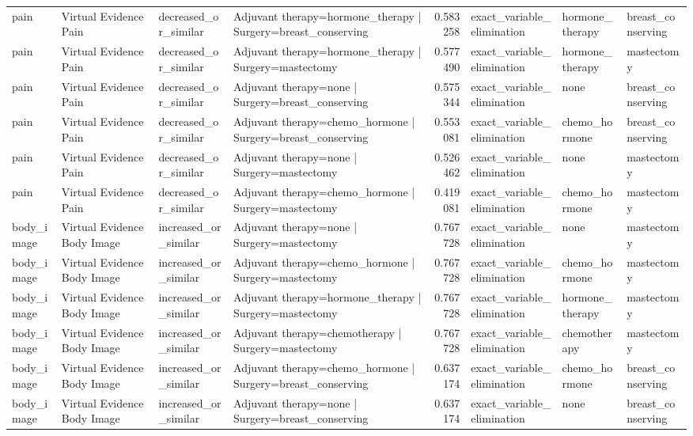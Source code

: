 \begin{table}
\begin{tabular}{llllrlll}
pain & Virtual Evidence Pain & decreased\_or\_similar & Adjuvant therapy=hormone\_therapy | Surgery=breast\_conserving & 0.583258 & exact\_variable\_elimination & hormone\_therapy & breast\_conserving \\
pain & Virtual Evidence Pain & decreased\_or\_similar & Adjuvant therapy=hormone\_therapy | Surgery=mastectomy & 0.577490 & exact\_variable\_elimination & hormone\_therapy & mastectomy \\
pain & Virtual Evidence Pain & decreased\_or\_similar & Adjuvant therapy=none | Surgery=breast\_conserving & 0.575344 & exact\_variable\_elimination & none & breast\_conserving \\
pain & Virtual Evidence Pain & decreased\_or\_similar & Adjuvant therapy=chemo\_hormone | Surgery=breast\_conserving & 0.553081 & exact\_variable\_elimination & chemo\_hormone & breast\_conserving \\
pain & Virtual Evidence Pain & decreased\_or\_similar & Adjuvant therapy=none | Surgery=mastectomy & 0.526462 & exact\_variable\_elimination & none & mastectomy \\
pain & Virtual Evidence Pain & decreased\_or\_similar & Adjuvant therapy=chemo\_hormone | Surgery=mastectomy & 0.419081 & exact\_variable\_elimination & chemo\_hormone & mastectomy \\
body\_image & Virtual Evidence Body Image & increased\_or\_similar & Adjuvant therapy=none | Surgery=mastectomy & 0.767728 & exact\_variable\_elimination & none & mastectomy \\
body\_image & Virtual Evidence Body Image & increased\_or\_similar & Adjuvant therapy=chemo\_hormone | Surgery=mastectomy & 0.767728 & exact\_variable\_elimination & chemo\_hormone & mastectomy \\
body\_image & Virtual Evidence Body Image & increased\_or\_similar & Adjuvant therapy=hormone\_therapy | Surgery=mastectomy & 0.767728 & exact\_variable\_elimination & hormone\_therapy & mastectomy \\
body\_image & Virtual Evidence Body Image & increased\_or\_similar & Adjuvant therapy=chemotherapy | Surgery=mastectomy & 0.767728 & exact\_variable\_elimination & chemotherapy & mastectomy \\
body\_image & Virtual Evidence Body Image & increased\_or\_similar & Adjuvant therapy=chemo\_hormone | Surgery=breast\_conserving & 0.637174 & exact\_variable\_elimination & chemo\_hormone & breast\_conserving \\
body\_image & Virtual Evidence Body Image & increased\_or\_similar & Adjuvant therapy=none | Surgery=breast\_conserving & 0.637174 & exact\_variable\_elimination & none & breast\_conserving \\

\end{tabular}
\end{table}
